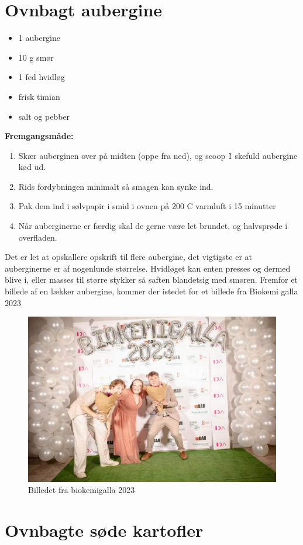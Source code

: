 \documentclass{book}
\begin{document}
\section{Ovnbagt aubergine}
\begin{minipage}[t]{0.5\textwidth}
\begin{itemize}
    \item 1 aubergine
    \item 10 g smør
    \item 1 fed hvidløg
    \item frisk timian
    \item salt og pebber
\end{itemize}
\end{minipage}
\begin{minipage}[t]{0.5\textwidth}
\textbf{Fremgangsmåde:}
\begin{enumerate}
    \item Skær auberginen over på midten (oppe fra ned), og scoop \~ 1 skefuld aubergine kød ud.
    \item Rids fordybningen minimalt så smagen kan synke ind.
    \item Pak dem ind i sølvpapir i smid i ovnen på 200 \degree C varmluft i 15 minutter
    \item Når auberginerne er færdig skal de gerne være let brundet, og halvsprøde i overfladen.
\end{enumerate}
\end{minipage}
Det er let at opskallere opskrift til flere aubergine, det vigtigste er at auberginerne er af nogenlunde størrelse. Hvidløget kan enten presses og dermed blive i, eller masses til større stykker så saften blandetsig med smøren.
\newpage 
Fremfor et billede af en lækker aubergine, kommer der istedet for et billede fra Biokemi galla 2023
\begin{figure}
    \centering
    \includegraphics[width=0.5\linewidth]{Galla.jpg}
    \caption{Billedet fra biokemigalla 2023}
\end{figure}
\newpage \section{Ovnbagte søde kartofler}
\end{document}
